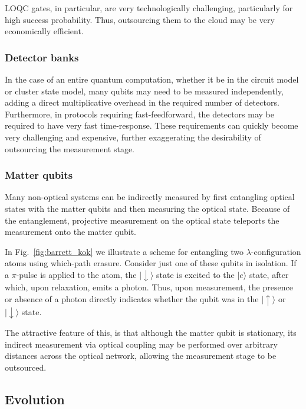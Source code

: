 \documentclass[aps,rmp,twocolumn,amsmath,amssymb,nofootinbib,superscriptaddress,longbibliography,floatfix]{revtex4-1}
\newcommand{\ket}[1]{|#1\rangle}
\begin{document}
LOQC gates, in particular, are very technologically challenging, particularly for high success probability. Thus, outsourcing them to the cloud may be very economically efficient.

%
%

\subsubsection{Detector banks}

In the case of an entire quantum computation, whether it be in the circuit model or cluster state model, many qubits may need to be measured independently, adding a direct multiplicative overhead in the required number of detectors. Furthermore, in protocols requiring fast-feedforward, the detectors may be required to have very fast time-response. These requirements can quickly become very challenging and expensive, further exaggerating the desirability of outsourcing the measurement stage.

%
%

\subsubsection{Matter qubits}

Many non-optical systems can be indirectly measured by first entangling optical states with the matter qubits and then measuring the optical state. Because of the entanglement, projective measurement on the optical state teleports the measurement onto the matter qubit.

In Fig.~\ref{fig:barrett_kok} we illustrate a scheme for entangling two $\lambda$-configuration atoms using which-path erasure. Consider just one of these qubits in isolation. If a $\pi$-pulse is applied to the atom, the $\ket{\downarrow}$ state is excited to the $\ket{e}$ state, after which, upon relaxation, emits a photon. Thus, upon measurement, the presence or absence of a photon directly indicates whether the qubit was in the $\ket\uparrow$ or $\ket\downarrow$ state.

The attractive feature of this, is that although the matter qubit is stationary, its indirect measurement via optical coupling may be performed over arbitrary distances across the optical network, allowing the measurement stage to be outsourced.

%
%

\subsection{Evolution}
\end{document}
